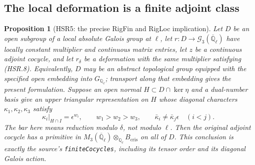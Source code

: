 \documentclass[11pt,a4paper]{article}
\numberwithin{equation}{section}
\newtheorem{proposition}[theorem]{Proposition}
\theoremstyle{remark}\newtheorem{remark}[theorem]{Remark}
\begin{document}
\subsection{The local deformation is a finite adjoint class}

\begin{proposition}[HSR5: the precise RigFin and RigLoc implication]
\label{claim:HSR5}
Let $D$ be an open subgroup of a local absolute Galois group at
$\ell$, let $r:D\to\mathcal G_3(\overline{\mathbb Q}_\ell)$
have locally constant multiplier and continuous matrix entries,
let $z$ be a continuous adjoint cocycle, and let $r_\delta$ be a
deformation with the same multiplier satisfying (HSR.8).
Equivalently, $D$ may be an abstract topological group equipped
with the specified open embedding into $G_{\mathbb Q_\ell}$;
transport along that embedding gives the present formulation.
Suppose an open normal
$H\subset D\cap\ker\eta$ and a dual-number basis give an upper
triangular representation on $H$ whose diagonal characters
$\kappa_1,\kappa_2,\kappa_3$ satisfy
\[
 \kappa_i|_{H\cap I}=\epsilon^{w_i},\qquad
 w_1>w_2>w_3,
 \qquad \bar\kappa_i\ne\bar\kappa_j\epsilon\quad(i<j).
 \tag{HSR.18}
\]
The bar here means reduction modulo $\delta$, not modulo $\ell$.
Then the original adjoint cocycle has a primitive in
$M_3(\overline{\mathbb Q}_\ell)\otimes_{\mathbb Q_\ell}
B_{\mathrm{cris}}$ on all of $D$.  This conclusion is exactly
the source's \texttt{finite\allowbreak Cocycles}, including its tensor order
and its diagonal Galois action.
\end{proposition}
\end{document}

